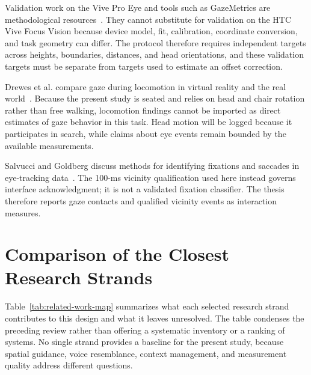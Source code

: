 Validation work on the Vive Pro Eye and tools such as GazeMetrics are methodological resources~\cite{schuetz2022vive,sipatchin2021usability,adhanom2020gazemetrics}. They cannot substitute for validation on the HTC Vive Focus Vision because device model, fit, calibration, coordinate conversion, and task geometry can differ. The protocol therefore requires independent targets across heights, boundaries, distances, and head orientations, and these validation targets must be separate from targets used to estimate an offset correction.

Drewes et al. compare gaze during locomotion in virtual reality and the real world~\cite{drewes2021locomotion}. Because the present study is seated and relies on head and chair rotation rather than free walking, locomotion findings cannot be imported as direct estimates of gaze behavior in this task. Head motion will be logged because it participates in search, while claims about eye events remain bounded by the available measurements.

Salvucci and Goldberg discuss methods for identifying fixations and saccades in eye-tracking data~\cite{salvucci2000fixations}. The 100-ms vicinity qualification used here instead governs interface acknowledgment; it is not a validated fixation classifier. The thesis therefore reports gaze contacts and qualified vicinity events as interaction measures.

\section{Comparison of the Closest Research Strands}
Table~\ref{tab:related-work-map} summarizes what each selected research strand contributes to this design and what it leaves unresolved. The table condenses the preceding review rather than offering a systematic inventory or a ranking of systems. No single strand provides a baseline for the present study, because spatial guidance, voice resemblance, context management, and measurement quality address different questions.

